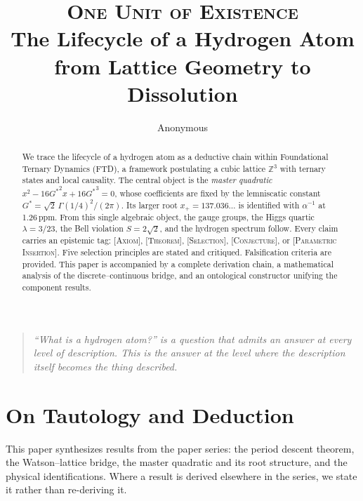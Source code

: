 \documentclass[12pt]{article}
\title{\textsc{One Unit of Existence}\\[6pt]
\large The Lifecycle of a Hydrogen Atom\\
from Lattice Geometry to Dissolution}
\author{Anonymous}
\date{}
\newcommand{\ZZ}{\mathbb{Z}}
\newcommand{\etag}[1]{{\normalfont\textsc{\footnotesize [#1]}}}
\theoremstyle{compact}
\begin{document}
\maketitle
\thispagestyle{empty}

\begin{abstract}
\noindent We trace the lifecycle of a hydrogen atom as a deductive chain within Foundational Ternary Dynamics (FTD), a framework postulating a cubic lattice $\ZZ^3$ with ternary states and local causality. The central object is the \emph{master quadratic} $x^2 - 16{G^{*}}^2 x + 16{G^{*}}^3 = 0$, whose coefficients are fixed by the lemniscatic constant ${G^{*}} = \sqrt{2}\,\Gamma(1/4)^2/(2\pi)$. Its larger root $x_+ = 137.036\ldots$ is identified with $\alpha^{-1}$ at 1.26\,ppm. From this single algebraic object, the gauge groups, the Higgs quartic $\lambda = 3/23$, the Bell violation $S = 2\sqrt{2}$, and the hydrogen spectrum follow. Every claim carries an epistemic tag: \etag{Axiom}, \etag{Theorem}, \etag{Selection}, \etag{Conjecture}, or \etag{Parametric Insertion}. Five selection principles are stated and critiqued. Falsification criteria are provided. This paper is accompanied by a complete derivation chain, a mathematical analysis of the discrete--continuous bridge, and an ontological constructor unifying the component results.
\end{abstract}

\smallskip

\begin{quote}\itshape
``What is a hydrogen atom?'' is a question that admits an answer at every level of description. This is the answer at the level where the description itself becomes the thing described.
\end{quote}

\section{On Tautology and Deduction}
\label{sec:tautology}

This paper synthesizes results from the paper series: the period descent theorem, the Watson--lattice bridge, the master quadratic and its root structure, and the physical identifications. Where a result is derived elsewhere in the series, we state it rather than re-deriving it.

\medskip
\end{document}
